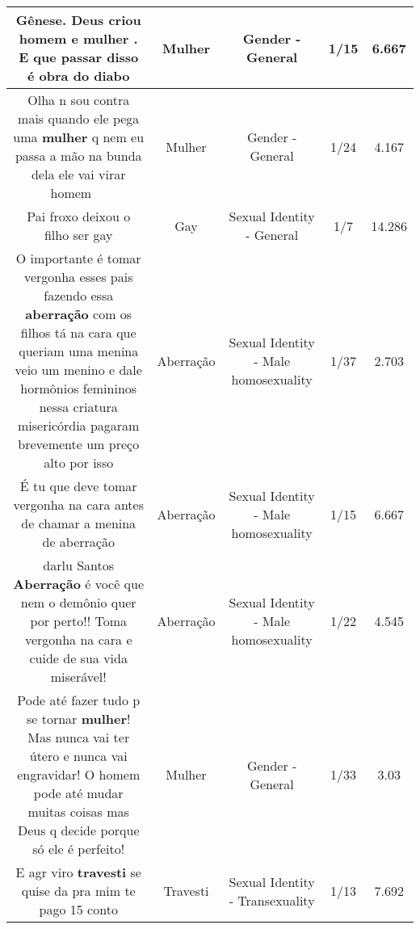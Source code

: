 \documentclass[11pt]{article}
\newlength\mylength
\begin{document}
\begin{center}
\begin{longtable}{|C{.65\mylength}|C{.30\mylength}|C{.12\mylength}|C{.12\mylength}|C{.12\mylength}|}
  \small Gênese. Deus criou homem e \textbf{mulher} . E que passar disso é obra do diabo\normalsize   & Mulher & Gender - General & 1/15 & 6.667 \\  \hline
  \small Olha n sou contra mais quando ele pega uma \textbf{mulher} q nem eu passa a mão na bunda dela ele vai virar homem ✌🏻🙂\normalsize   & Mulher & Gender - General & 1/24 & 4.167 \\  \hline
  \small Pai froxo deixou o filho ser gay\normalsize   & Gay & Sexual Identity - General & 1/7 & 14.286 \\  \hline
  \small O importante é tomar vergonha esses pais fazendo essa \textbf{aberração} com os filhos tá na cara que queriam uma menina veio um menino e dale hormônios femininos nessa criatura misericórdia pagaram brevemente um preço alto por isso\normalsize   & Aberração & Sexual Identity - Male homosexuality & 1/37 & 2.703 \\  \hline
  \small É tu que deve tomar vergonha na cara antes de chamar a menina de aberração\normalsize   & Aberração & Sexual Identity - Male homosexuality & 1/15 & 6.667 \\  \hline
  \small darlu Santos \textbf{Aberração} é você que nem o demônio quer por perto!! Toma vergonha na cara e cuide de sua vida miserável!\normalsize   & Aberração & Sexual Identity - Male homosexuality & 1/22 & 4.545 \\  \hline
  \small Pode até fazer tudo p se tornar \textbf{mulher}! Mas nunca vai ter útero e nunca vai engravidar! O homem pode até mudar muitas coisas mas Deus q decide porque só ele é perfeito!\normalsize   & Mulher & Gender - General & 1/33 & 3.03 \\  \hline
  \small E agr viro \textbf{travesti} se quise da pra mim te pago 15 conto\normalsize   & Travesti & Sexual Identity - Transexuality & 1/13 & 7.692 \\  \hline

\end{longtable}
\end{center}
\end{document}
